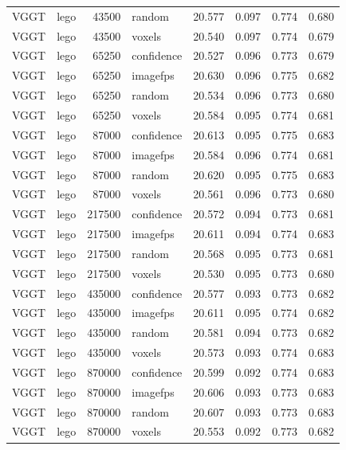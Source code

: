 \begin{table}[H]
\begin{tabular}{llrlrrrr}
VGGT & lego & 43500 & random & 20.577 & 0.097 & 0.774 & 0.680 \\
VGGT & lego & 43500 & voxels & 20.540 & 0.097 & 0.774 & 0.679 \\
VGGT & lego & 65250 & confidence & 20.527 & 0.096 & 0.773 & 0.679 \\
VGGT & lego & 65250 & imagefps & 20.630 & 0.096 & 0.775 & 0.682 \\
VGGT & lego & 65250 & random & 20.534 & 0.096 & 0.773 & 0.680 \\
VGGT & lego & 65250 & voxels & 20.584 & 0.095 & 0.774 & 0.681 \\
VGGT & lego & 87000 & confidence & 20.613 & 0.095 & 0.775 & 0.683 \\
VGGT & lego & 87000 & imagefps & 20.584 & 0.096 & 0.774 & 0.681 \\
VGGT & lego & 87000 & random & 20.620 & 0.095 & 0.775 & 0.683 \\
VGGT & lego & 87000 & voxels & 20.561 & 0.096 & 0.773 & 0.680 \\
VGGT & lego & 217500 & confidence & 20.572 & 0.094 & 0.773 & 0.681 \\
VGGT & lego & 217500 & imagefps & 20.611 & 0.094 & 0.774 & 0.683 \\
VGGT & lego & 217500 & random & 20.568 & 0.095 & 0.773 & 0.681 \\
VGGT & lego & 217500 & voxels & 20.530 & 0.095 & 0.773 & 0.680 \\
VGGT & lego & 435000 & confidence & 20.577 & 0.093 & 0.773 & 0.682 \\
VGGT & lego & 435000 & imagefps & 20.611 & 0.095 & 0.774 & 0.682 \\
VGGT & lego & 435000 & random & 20.581 & 0.094 & 0.773 & 0.682 \\
VGGT & lego & 435000 & voxels & 20.573 & 0.093 & 0.774 & 0.683 \\
VGGT & lego & 870000 & confidence & 20.599 & 0.092 & 0.774 & 0.683 \\
VGGT & lego & 870000 & imagefps & 20.606 & 0.093 & 0.773 & 0.683 \\
VGGT & lego & 870000 & random & 20.607 & 0.093 & 0.773 & 0.683 \\
VGGT & lego & 870000 & voxels & 20.553 & 0.092 & 0.773 & 0.682 \\
\bottomrule
\end{tabular}
\end{table}